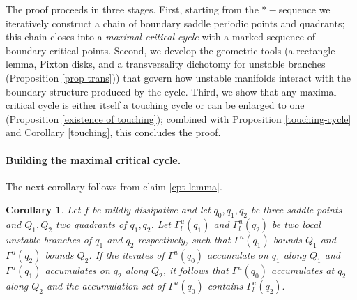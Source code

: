 \documentclass[a4paper,11pt]{article}
\newtheorem{lemma}{Lemma}
\newtheorem{corollary}[lemma]{Corollary}
\theoremstyle{definition}
\def\Ga{\Gamma}
\def\Ga{\Gamma}
\begin{document}
The proof proceeds in three stages. First, starting from the 
$*-$sequence we iteratively construct a chain of boundary saddle periodic points and quadrants; this chain closes into a {\it maximal critical cycle} with a marked sequence of boundary critical points. Second, we develop the geometric tools (a rectangle lemma, Pixton disks, and a transversality dichotomy for unstable branches (Proposition \ref{prop trans})) that govern how unstable manifolds interact with the boundary structure produced by the cycle. Third, we show that any maximal critical cycle is either itself a touching cycle or can be enlarged to one (Proposition \ref{existence of touching}); combined with Proposition \ref{touching-cycle} and Corollary \ref{touching}, this concludes the proof.

\paragraph{Building the maximal critical cycle.} The next corollary follows from  claim \ref{cpt-lemma}.

    

\begin{corollary}\label{jumping} Let $f$ be mildly dissipative and let $q_0, q_1, q_2$ be  three  saddle points and  $Q_1, Q_2$ two quadrants of $q_1, q_2$. Let  $\Ga^u_l(q_1)$ and $\Ga^u_l(q_2)$ be two  local unstable branches of $q_1$ and $q_2$ respectively, such that $\Ga^u(q_1)$  bounds $Q_1$ and $\Ga^u(q_2)$  bounds $Q_2$. If the iterates of $\Ga^u(q_0)$ accumulate on $q_1$ along $Q_1$ and $\Ga^u(q_1)$ accumulates on $q_2$ along $Q_2$, it follows that $\Ga^u(q_0)$ accumulates at $q_2$ along $Q_2$ and the accumulation set of $\Ga^u(q_0)$ contains $\Ga^u_l(q_2).$ 
    
\end{corollary}
\end{document}

